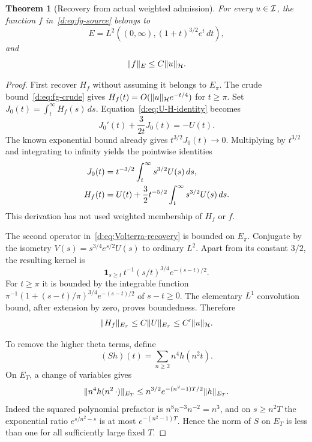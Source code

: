 \documentclass[11pt,a4paper]{article}
\numberwithin{equation}{section}
\newtheorem{theorem}{Theorem}[section]
\theoremstyle{definition}\newtheorem{definition}[theorem]{Definition}
\theoremstyle{remark}\newtheorem{remark}[theorem]{Remark}
\newcommand{\Hh}{\mathcal H}\newcommand{\Hw}{\mathcal H}
\begin{document}
\begin{theorem}[Recovery from actual weighted admission]\label{d:thm:recovery}
For every $u\in\mathcal I$, the function $f$ in~\eqref{d:eq:fg-source} belongs to
\begin{equation}\label{d:eq:E-global}
 E=L^2((0,\infty),(1+t)^{3/2}e^t\,dt),
\end{equation}
and
\begin{equation}\label{d:eq:recovery-bound}
 \norm{f}_E\le C\norm{u}_{\Hh}.
\end{equation}
\end{theorem}
\begin{proof}
First recover $H_f$ without assuming it belongs to $E_\pi$. The crude bound~\eqref{d:eq:fg-crude} gives
$H_f(t)=O(\norm{u}_{\Hh}e^{-t/4})$ for $t\ge\pi$. Set
$J_0(t)=\int_t^\infty H_f(s)\,ds$. Equation~\eqref{d:eq:U-H-identity} becomes
\[
 J_0'(t)+\frac3{2t}J_0(t)=-U(t).
\]
The known exponential bound already gives $t^{3/2}J_0(t)\to0$. Multiplying by $t^{3/2}$ and integrating to infinity yields the pointwise identities
\begin{align}
 J_0(t)&=t^{-3/2}\int_t^\infty s^{3/2}U(s)\,ds,\notag\\
 H_f(t)&=U(t)+\frac32t^{-5/2}\int_t^\infty s^{3/2}U(s)\,ds.
 \label{d:eq:Volterra-recovery}
\end{align}
This derivation has not used weighted membership of $H_f$ or $f$.

The second operator in~\eqref{d:eq:Volterra-recovery} is bounded on $E_\pi$. Conjugate by the isometry
$V(s)=s^{3/4}e^{s/2}U(s)$ to ordinary $L^2$. Apart from its constant $3/2$, the resulting kernel is
\[
 \boldsymbol1_{s\ge t}\,t^{-1}(s/t)^{3/4}e^{-(s-t)/2}.
\]
For $t\ge\pi$ it is bounded by the integrable function
$\pi^{-1}(1+(s-t)/\pi)^{3/4}e^{-(s-t)/2}$ of $s-t\ge0$.
The elementary $L^1$ convolution bound, after extension by zero, proves boundedness. Therefore
\begin{equation}\label{d:eq:Hf-weighted}
 \norm{H_f}_{E_\pi}\le C\norm{U}_{E_\pi}
 \le C'\norm{u}_{\Hh}.
\end{equation}

To remove the higher theta terms, define
\[
 (Sh)(t)=\sum_{n\ge2}n^4h(n^2t).
\]
On $E_T$, a change of variables gives
\begin{equation}\label{d:eq:dilation-E}
 \lVert n^4h(n^2\,\cdot)\rVert_{E_T}
 \le n^{3/2}e^{-(n^2-1)T/2}\lVert h\rVert_{E_T}.
\end{equation}
Indeed the squared polynomial prefactor is $n^8n^{-3}n^{-2}=n^3$, and on $s\ge n^2T$ the exponential ratio
$e^{s/n^2-s}$ is at most $e^{-(n^2-1)T}$. Hence the norm of $S$ on $E_T$ is less than one for all sufficiently large fixed $T$.


\end{proof}
\end{document}
